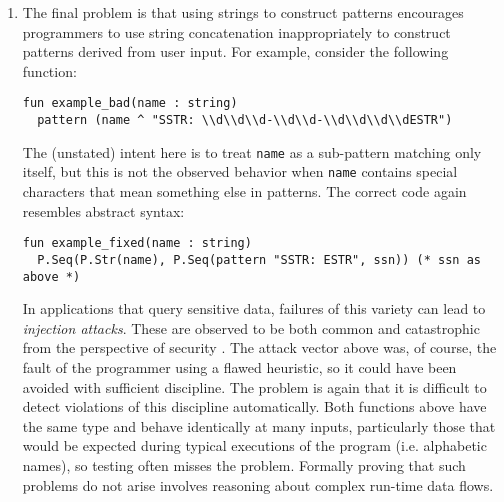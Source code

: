 \begin{enumerate}
\item The final problem is that using strings to construct patterns encourages programmers to use string concatenation inappropriately to construct patterns derived from user input. For example, consider the following function:
\begin{lstlisting}[numbers=none,escapechar=|]
fun example_bad(name : string)
  pattern (name ^ "SSTR: \\d\\d\\d-\\d\\d-\\d\\d\\d\\dESTR")
\end{lstlisting}
The (unstated) intent here is to treat \lstinline{name} as a sub-pattern matching only itself, but this is not the observed behavior when \lstinline{name} contains special characters that mean something else in patterns. The correct code again resembles abstract syntax: 
\begin{lstlisting}[numbers=none]
fun example_fixed(name : string)
  P.Seq(P.Str(name), P.Seq(pattern "SSTR: ESTR", ssn)) (* ssn as above *)
\end{lstlisting}

In applications that query sensitive data, failures of this variety can lead to \emph{injection attacks}.  These are observed to be both common and catastrophic from the perspective of security \cite{owasp2013}. The attack vector above was, of course, the fault of the programmer using a flawed heuristic, so it could have been avoided with sufficient discipline. 
The problem is again that it is difficult to detect violations of this discipline automatically. Both functions above have the same type and behave identically at many inputs, particularly those that would be expected during typical executions of the program (i.e. alphabetic names), so testing often misses the problem. Formally proving that such problems do not arise involves reasoning about complex run-time data flows. 

\end{enumerate}

